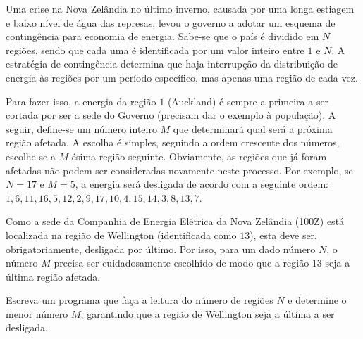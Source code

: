 Uma crise na Nova Zelândia no último inverno, causada por uma longa estiagem e baixo nível de água das represas, levou o governo a adotar um esquema de contingência para economia de energia. Sabe-se que o país é dividido em $N$ regiões, sendo que cada uma é identificada por um valor inteiro entre $1$ e $N$. A estratégia de contingência determina que haja interrupção da distribuição de energia às regiões por um período específico, mas apenas uma região de cada vez.

Para fazer isso, a energia da região $1$ (Auckland) é sempre a primeira a ser cortada por ser a sede do Governo (precisam dar o exemplo à população). A seguir, define-se um número inteiro $M$ que determinará qual será a próxima região afetada. A escolha é simples, seguindo a ordem crescente dos números, escolhe-se a $M$-ésima região seguinte. Obviamente, as regiões que já foram afetadas não podem ser consideradas novamente neste processo. Por exemplo, se $N=17$ e $M=5$, a energia será desligada de acordo com a seguinte ordem: $1, 6, 11, 16, 5, 12, 2, 9, 17, 10, 4, 15, 14, 3, 8, 13, 7$.

Como a sede da Companhia de Energia Elétrica da Nova Zelândia (100Z) está localizada na região de Wellington (identificada como $13$), esta deve ser, obrigatoriamente, desligada por último. Por isso, para um dado número $N$, o número $M$ precisa ser cuidadosamente escolhido de modo que a região $13$ seja a última região afetada.

Escreva um programa que faça a leitura do número de regiões $N$ e determine o menor número $M$, garantindo que a região de Wellington seja a última a ser desligada.
